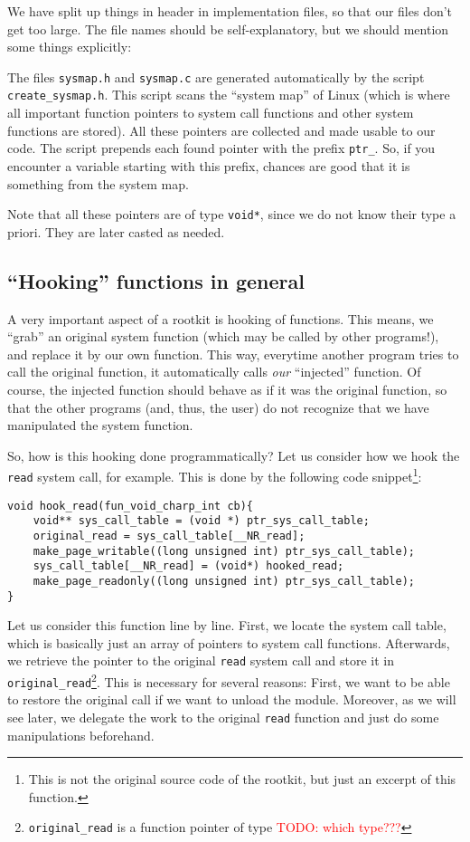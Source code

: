 \documentclass[10pt, letterpaper]{article}
\newcommand{\todo}[1]{\textcolor{red}{TODO: #1}}
\begin{document}
We have split up things in header in implementation files, so
that our files don't get too large. The file names should be self-explanatory, but we should mention some things explicitly:

The files \texttt{sysmap.h} and \texttt{sysmap.c} are generated automatically by the script \texttt{create\_sysmap.h}. This script scans the ``system map'' of Linux (which is where all important function pointers to system call functions and other system functions are stored). All these pointers are collected and made usable to our code. The script prepends each found pointer with the prefix \texttt{ptr\_}. So, if you encounter a variable starting with this prefix, chances are good that it is something from the system map.

Note that all these pointers are of type \texttt{void*}, since we do not know their type a priori. They are later casted as needed.

\subsection{``Hooking'' functions in general}

A very important aspect of a rootkit is hooking of functions. This means, we ``grab'' an original system function (which may be called by other programs!), and replace it by our own function. This way, everytime another program tries to call the original function, it automatically calls \emph{our} ``injected'' function. Of course, the injected function should behave as if it was the original function, so that the other programs (and, thus, the user) do not recognize that we have manipulated the system function.

So, how is this hooking done programmatically? Let us consider how we hook the \texttt{read} system call, for example. This is done by the following code snippet\footnote{This is not the original source code of the rootkit, but just an excerpt of this function.}:

\begin{verbatim}
void hook_read(fun_void_charp_int cb){
    void** sys_call_table = (void *) ptr_sys_call_table;
    original_read = sys_call_table[__NR_read];
    make_page_writable((long unsigned int) ptr_sys_call_table);
    sys_call_table[__NR_read] = (void*) hooked_read;
    make_page_readonly((long unsigned int) ptr_sys_call_table);
}
\end{verbatim}

Let us consider this function line by line. First, we locate the system call table, which is basically just an array of pointers to system call functions. Afterwards, we retrieve the pointer to the original \texttt{read} system call and store it in  \texttt{original\_read}\footnote{\texttt{original\_read} is a function pointer of type \todo{which type???}}. This is necessary for several reasons: First, we want to be able to restore the original call if we want to unload the module. Moreover, as we will see later, we delegate the work to the original \texttt{read} function and just do some manipulations beforehand.
\end{document}
